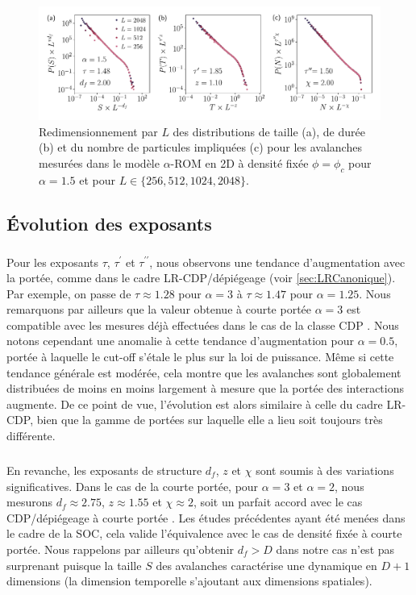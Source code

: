 \begin{figure}[h]
	\centering
	\includegraphics[width=\textwidth]{Chapitre3/Figures/Avalanches/Rescale_Av_alpha15.pdf}
	\caption{Redimensionnement par $L$ des distributions de taille (a), de durée (b) et du nombre de particules impliquées (c) pour les avalanches mesurées dans le modèle $\alpha$-ROM en 2D à densité fixée $\phi=\phi_c$ pour $\alpha = 1.5$ et pour $L \in \{ 256, 512, 1024, 2048 \}$.}
	\label{fig:AvSuspRescaled}
\end{figure}

\subsection{Évolution des exposants}

\subparagraph{}Pour les exposants $\tau$, $\tau^\prime$ et $\tau^{\prime\prime}$, nous observons une tendance d'augmentation avec la portée, comme dans le cadre LR-CDP/dépiégeage (voir \autoref{sec:LRCanonique}). Par exemple, on passe de $\tau\approx 1.28$ pour $\alpha=3$ à $\tau\approx 1.47$ pour $\alpha=1.25$. Nous remarquons par ailleurs que la valeur obtenue à courte portée $\alpha = 3$ est compatible avec les mesures déjà effectuées dans le cas de la classe CDP  \cite{chessa_critical_1999}. Nous notons cependant une anomalie à cette tendance d'augmentation pour $\alpha=0.5$, portée à laquelle le cut-off s'étale le plus sur la loi de puissance. Même si cette tendance générale est modérée, cela montre que les avalanches sont globalement distribuées de moins en moins largement à mesure que la portée des interactions augmente. De ce point de vue, l'évolution est alors similaire à celle du cadre LR-CDP, bien que la gamme de portées sur laquelle elle a lieu soit toujours très différente.

\subparagraph{}En revanche, les exposants de structure $d_f$, $z$ et $\chi$ sont soumis à des variations significatives. Dans le cas de la courte portée, pour $\alpha=3$ et $\alpha=2$, nous mesurons $d_f \approx 2.75$, $z\approx 1.55$ et $\chi\approx 2$, soit un parfait accord avec le cas CDP/dépiégeage à courte portée \cite{chessa_universality_1999, lubeck_universal_2004, chessa_critical_1999, wiese_theory_2022, rosso_depinning_2003}. Les études précédentes ayant été menées dans le cadre de la SOC, cela valide l'équivalence avec le cas de densité fixée à courte portée. Nous rappelons par ailleurs qu'obtenir $d_f>D$ dans notre cas n'est pas surprenant puisque la taille $S$ des avalanches caractérise une dynamique en $D+1$ dimensions (la dimension temporelle s'ajoutant aux dimensions spatiales). 


